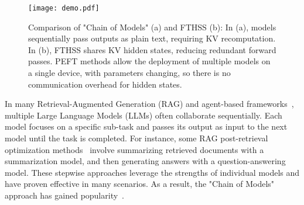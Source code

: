 \begin{figure}[t] 
\centerline{
\texttt{[image: demo.pdf]}} 
\caption{ 
Comparison of "Chain of Models" (a) and FTHSS (b): In (a), models sequentially pass outputs as plain text, requiring KV recomputation. In (b), FTHSS shares KV hidden states, reducing redundant forward passes. PEFT methods allow the deployment of multiple models on a single device, with parameters changing, so there is no communication overhead for hidden states.
} 
\label{fig:demo} 
\end{figure}

In many Retrieval-Augmented Generation (RAG) and agent-based frameworks~\cite{lewis2020retrieval}, multiple Large Language Models (LLMs) often collaborate sequentially. Each model focuses on a specific sub-task and passes its output as input to the next model until the task is completed\cite{zhang2024chain}. For instance, some RAG post-retrieval optimization methods~\cite{xu2023recomp,kim2024sure} involve summarizing retrieved documents with a summarization model, and then generating answers with a question-answering model. 
These stepwise approaches leverage the strengths of individual models and have proven effective in many scenarios. As a result, the "Chain of Models" approach has gained popularity~\cite{zhang2024chain}. 


